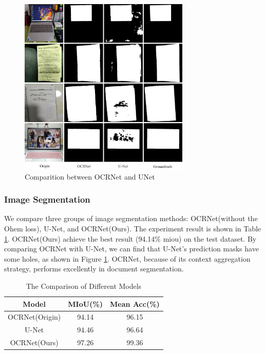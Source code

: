 \documentclass[10pt, conference, compsocconf]{IEEEtran}
\begin{document}
\begin{figure}[!t]
	\centering
	\label{figure:Comparition}
	\includegraphics[width=3.2in]{./Assets/final_whole_img.jpg}
	\caption{Comparition between OCRNet and UNet}
\end{figure}
	

\subsubsection{Image Segmentation}

We compare three groups of image segmentation methods: OCRNet(without the Ohem loss), U-Net, and OCRNet(Ours). 
The experiment result is shown in Table \ref{table:comparition}.
OCRNet(Ours) achieve the best result (94.14\% miou) on the test dataset.
By comparing OCRNet with U-Net, we can find that U-Net's prediction masks have some holes, as shown in Figure \ref{figure:Comparition}. 
OCRNet, because of its context aggregation strategy, performs excellently in document segmentation.

\begin{table}[!h]
	\caption{The Comparison of Different Models}
	\centering
	\label{table:comparition}
	\begin{tabular}{ccc} \\
	\hline
	Model & MIoU(\%) & Mean Acc(\%)\\
	\hline
	OCRNet(Origin) & 94.14 & 96.15\\
	U-Net & 94.46 & 96.64\\
	OCRNet(Ours) & 97.26 & 99.36\\
	\hline
	\end{tabular}
\end{table}
\end{document}
